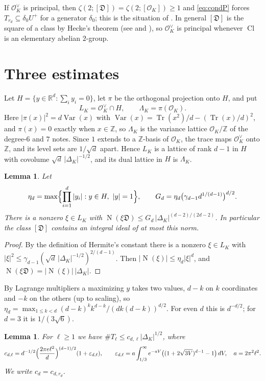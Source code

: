 \documentclass[11pt]{amsart}
\newtheorem{lemma}[theorem]{Lemma}
\theoremstyle{definition}
\numberwithin{equation}{section}
\DeclareMathOperator{\Tr}{Tr}
\DeclareMathOperator{\Var}{Var}
\DeclareMathOperator{\N}{N}
\DeclareMathOperator{\Cl}{Cl}
\newcommand{\OK}{\mathcal{O}_K}
\newcommand{\OKd}{\mathcal{O}_K^{\vee}}
\newcommand{\Dif}{\mathfrak{D}}
\newcommand{\Z}{\mathbb{Z}}
\newcommand{\R}{\mathbb{R}}
\newcommand{\LamK}{\Lambda_K}
\begin{document}
If $\OKd$ is principal, then $\zeta(2;[\Dif])=\zeta(2;[\OK])\ge1$ and \eqref{eq:condP} forces
$T_{r_d}\subseteq\delta_0U^+$ for a generator $\delta_0$; this is the situation of
\cite{KY1,KM}.  In general $[\Dif]$ is the square of a class by Hecke's theorem (see \cite{Ar} and
\cite[Remark~1.2]{KL}), so $\OKd$ is principal whenever $\Cl$ is an elementary abelian $2$-group.

\section{Three estimates}\label{sec:estimates}

Let $H=\{y\in\R^d:\sum_iy_i=0\}$, let $\pi$ be the orthogonal projection onto $H$, and put
\[
  L_K=\OKd\cap H,\qquad \LamK=\pi(\OK).
\]
Here $|\pi(x)|^2=d\Var(x)$ with $\Var(x)=\Tr(x^2)/d-(\Tr(x)/d)^2$, and $\pi(x)=0$ exactly when
$x\in\Z$, so $\LamK$ is the variance lattice $\OK/\Z$ of the degree-$6$ and $7$ notes.  Since
$1$ extends to a $\Z$-basis of $\OK$, the trace maps $\OKd$ onto $\Z$, and its level sets are
$1/\sqrt d$ apart.  Hence $L_K$ is a lattice of rank $d-1$ in $H$ with covolume
$\sqrt d\,|\Delta_K|^{-1/2}$, and its dual lattice in $H$ is $\LamK$.

\begin{lemma}\label{lem:small}
Let
\[
  \eta_d=\max\Bigl\{\prod_{i=1}^d|y_i| : y\in H,\ |y|=1\Bigr\},\qquad
  G_d=\eta_d\bigl(\gamma_{d-1}d^{1/(d-1)}\bigr)^{d/2}.
\]
There is a nonzero $\xi\in L_K$ with $\N(\xi\Dif)\le G_d\,|\Delta_K|^{(d-2)/(2d-2)}$.  In particular
the class $[\Dif]$ contains an integral ideal of at most this norm.
\end{lemma}

\begin{proof}
By the definition of Hermite's constant there is a nonzero $\xi\in L_K$ with
$|\xi|^2\le\gamma_{d-1}(\sqrt d\,|\Delta_K|^{-1/2})^{2/(d-1)}$.  Then
$|\N(\xi)|\le\eta_d|\xi|^d$, and $\N(\xi\Dif)=|\N(\xi)|\,|\Delta_K|$.
\end{proof}

By Lagrange multipliers a maximizing $y$ takes two values, $d-k$ on $k$ coordinates and $-k$ on the
others (up to scaling), so $\eta_d=\max_{1\le k<d}(d-k)^kk^{d-k}/(dk(d-k))^{d/2}$.  For even $d$ this
is $d^{-d/2}$; for $d=3$ it is $1/(3\sqrt6)$.

\begin{lemma}\label{lem:count}
For $\ell\ge1$ we have $\#T_\ell\le c_{d,\ell}|\Delta_K|^{1/2}$, where
\[
  c_{d,\ell}=d^{-1/2}\Bigl(\frac{2\pi e\ell^2}{d}\Bigr)^{(d-1)/2}(1+\varepsilon_{d,\ell}),\qquad
  \varepsilon_{d,\ell}=a\int_{1/3}^\infty e^{-aV}\bigl((1+2\sqrt{3V})^{d-1}-1\bigr)\,dV,\quad a=2\pi^2\ell^2 .
\]
We write $c_d=c_{d,r_d}$.
\end{lemma}
\end{document}
